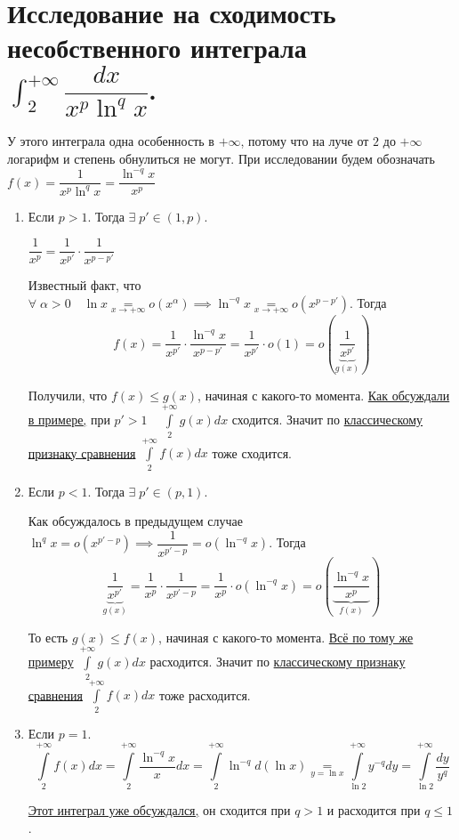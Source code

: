 \documentclass[../main.tex]{subfiles}
\begin{document}
\newpage
\section{Исследование на сходимость несобственного интеграла \( \int_{ 2}^{ + \infty } \dfrac{ dx}{ x^p\ln^qx}\).}
У этого интеграла одна особенность в \( + \infty \), потому что на луче от \( 2 \) до \( + \infty \) логарифм и степень обнулиться не могут. При исследовании 
будем обозначать \( f\left( x\right)=\dfrac{ 1}{ x^p\ln^qx}= \dfrac{ \ln^{-q}x}{ x^p} \)
\begin{enumerate}
    \item Если \( p > 1\). Тогда \( \exists \; p' \in \left( 1, p\right)\).
    \par \( \dfrac{ 1}{ x^p} = \dfrac{ 1}{ x^{p'}} \cdot \dfrac{ 1}{ x^{p-p'}} \)
    \par Известный факт, что \( \forall \; \alpha >0\quad \ln x\underset{x \rightarrow + \infty }{=} o\left( x^{ \alpha }\right) \implies \ln ^{-q}x \underset{x \rightarrow + \infty }{=} o\left( x^{p-p'}\right)\). Тогда 
    \[ f\left( x\right)= \dfrac{ 1}{ x^{p'}} \cdot \dfrac{ \ln^{-q}x}{ x^{p-p'}} = \dfrac{ 1}{ x^{p'}} \cdot o\left( 1\right) =o ( \underbrace{\dfrac{ 1}{ x^{p'}}}_{g \left( x\right)} )\]
    \par Получили, что \( f\left( x\right) \leq g \left( x\right)\), начиная с какого-то момента. \hyperlink{ex:converge}{Как обсуждали в примере,} при \( p'>1\quad \displaystyle\int\limits_{ 2}^{ + \infty } g \left( x\right)dx\) сходится. 
    Значит по \hyperlink{thm:converge_classic}{классическому признаку сравнения} \( \displaystyle\int\limits_{ 2}^{ + \infty } f\left( x\right)dx\) тоже сходится.
    \item Если \( p<1\). Тогда \( \exists \; p' \in \left( p,1\right)\).
    \par Как обсуждалось в предыдущем случае \( \ln ^qx=o \left( x^{p'-p}\right) \implies \dfrac{ 1}{ x^{p'-p}}=o \left( \ln ^{-q}x\right) \). Тогда 
    \[ \underbrace{ \dfrac{ 1}{ x^{p'}} }_{g \left( x\right)} = \dfrac{ 1}{ x^p} \cdot \dfrac{ 1}{ x^{p'-p}} = \dfrac{ 1}{ x^p} \cdot o\left( \ln ^{-q}x\right)=o \left( \underbrace{\dfrac{ \ln^{-q}x}{ x^p}}_{f \left( x\right)} \right)\]
    \par То есть \( g \left( x\right) \leq f \left( x\right)\), начиная с какого-то момента. \hyperlink{ex:converge}{Всё по тому же примеру} \( \displaystyle\int\limits_{ 2}^{ + \infty } g \left( x\right)dx\) расходится. 
    Значит по \hyperlink{thm:converge_classic}{классическому признаку сравнения} \( \displaystyle\int\limits_{ 2}^{ + \infty } f\left( x\right)dx\) тоже расходится. 
    \item Если \( p=1\).
    \[ \displaystyle\int\limits_{ 2}^{ + \infty } f\left( x\right)dx= \displaystyle\int\limits_{ 2}^{ + \infty } \dfrac{ \ln^{-q}x}{ x} dx= \displaystyle\int\limits_{ 2}^{ + \infty } \ln ^{-q}d\left( \ln x\right)\underset{y=\ln x}{=} \displaystyle\int\limits_{ \ln 2}^{ + \infty } y^{-q}dy= \displaystyle\int\limits_{ \ln 2}^{ + \infty } \dfrac{ dy}{ y^q} \]
    \par \hyperlink{ex:converge}{Этот интеграл уже обсуждался,} он сходится при \( q>1\) и расходится при \( q \leq 1\).
\end{enumerate}
\end{document}
